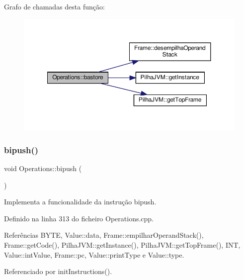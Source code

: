Grafo de chamadas desta função\+:\nopagebreak
\begin{figure}[H]
\begin{center}
\leavevmode
\includegraphics[width=350pt]{classOperations_a6f0ded6d2fc9921a1418387527bec8f4_cgraph}
\end{center}
\end{figure}
\mbox{\label{classOperations_a981b0f43cbe76b4fe7e2122c482d4a5b}} 
\subsubsection{\texorpdfstring{bipush()}{bipush()}}
{\footnotesize\ttfamily void Operations\+::bipush (\begin{DoxyParamCaption}{ }\end{DoxyParamCaption})\hspace{0.3cm}{\ttfamily [private]}}



Implementa a funcionalidade da instrução bipush. 



Definido na linha 313 do ficheiro Operations.\+cpp.



Referências B\+Y\+TE, Value\+::data, Frame\+::empilhar\+Operand\+Stack(), Frame\+::get\+Code(), Pilha\+J\+V\+M\+::get\+Instance(), Pilha\+J\+V\+M\+::get\+Top\+Frame(), I\+NT, Value\+::int\+Value, Frame\+::pc, Value\+::print\+Type e Value\+::type.



Referenciado por init\+Instructions().

